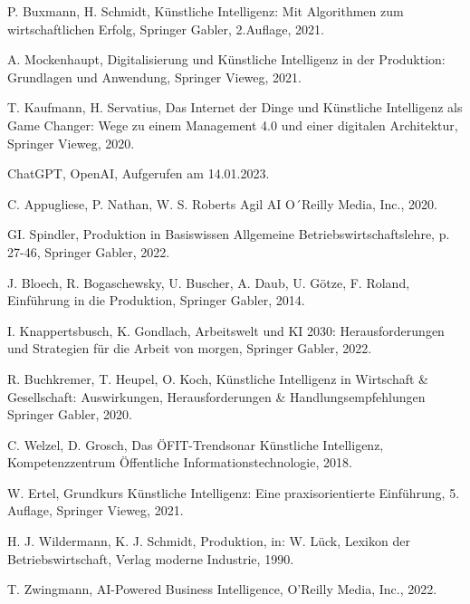 

\clearpage
{}



\begin{thebibliography}{99}

	P. Buxmann, H. Schmidt,
	Künstliche Intelligenz: Mit Algorithmen zum wirtschaftlichen Erfolg,
	Springer Gabler,
	2.Auflage,
	2021.
	
	A. Mockenhaupt,
	Digitalisierung und Künstliche Intelligenz in der Produktion: Grundlagen und Anwendung,
	Springer Vieweg,
	2021.

	T. Kaufmann, H. Servatius,
	Das Internet der Dinge und Künstliche Intelligenz als Game Changer: Wege zu einem Management 4.0 und einer digitalen Architektur,
	Springer Vieweg,
	2020.

	ChatGPT,
	OpenAI,
	Aufgerufen am 14.01.2023.

	C. Appugliese, P. Nathan, W. S. Roberts
	Agil AI
	O´Reilly Media, Inc.,
	2020.

	GI. Spindler,
	Produktion in Basiswissen Allgemeine Betriebswirtschaftslehre,
	p. 27-46,
	Springer Gabler,
	2022.

	J. Bloech, R. Bogaschewsky, U. Buscher, A. Daub, U. Götze, F. Roland,
	Einführung in die Produktion,
	Springer Gabler, 
	2014.
	
	I. Knappertsbusch, K. Gondlach,
	Arbeitswelt und KI 2030: Herausforderungen und Strategien für die Arbeit von morgen,
	Springer Gabler,
	2022.

	R. Buchkremer, T. Heupel, O. Koch,
	Künstliche Intelligenz in Wirtschaft \& Gesellschaft: Auswirkungen, Herausforderungen \& Handlungsempfehlungen
	Springer Gabler,
	2020.

	C. Welzel, D. Grosch,
	Das ÖFIT-Trendsonar Künstliche Intelligenz,
	Kompetenzzentrum Öffentliche Informationstechnologie,
	2018.

	W. Ertel,
	Grundkurs Künstliche Intelligenz: Eine praxisorientierte Einführung,
	5. Auflage,
	Springer Vieweg,
	2021.

	H. J. Wildermann, K. J. Schmidt,
	Produktion, 
	in: W. Lück, Lexikon der Betriebswirtschaft,
	Verlag moderne Industrie,
	1990.


	T. Zwingmann,
	AI-Powered Business Intelligence,
	O'Reilly Media, Inc.,
	2022.


\end{thebibliography}
